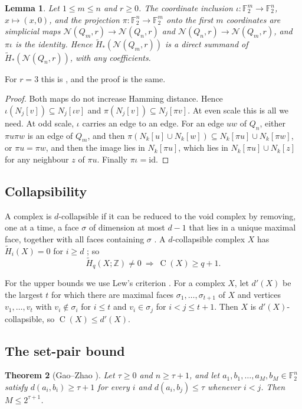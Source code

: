 \documentclass[11pt]{amsart}
\newtheorem{theorem}{Theorem}[section]
\newtheorem{lemma}[theorem]{Lemma}
\theoremstyle{definition}
\theoremstyle{remark}
\newcommand{\N}{\mathcal{N}}
\newcommand{\Q}{Q}
\newcommand{\F}{\mathbb{F}}
\newcommand{\Z}{\mathbb{Z}}
\newcommand{\Hred}{\widetilde{H}}
\newcommand{\cl}[2]{N_{#1}[#2]}
\newcommand{\C}{\operatorname{C}}
\begin{document}
\begin{lemma}\label{lem:retract}
Let $1\le m\le n$ and $r\ge0$. The coordinate inclusion $\iota\colon\F_2^m\to\F_2^n$, $x\mapsto(x,0)$, and the projection
$\pi\colon\F_2^n\to\F_2^m$ onto the first $m$ coordinates are simplicial maps $\N(\Q_m,r)\to\N(\Q_n,r)$ and
$\N(\Q_n,r)\to\N(\Q_m,r)$, and $\pi\iota$ is the identity. Hence $\Hred_*(\N(\Q_m,r))$ is a direct summand of
$\Hred_*(\N(\Q_n,r))$, with any coefficients.
\end{lemma}

For $r=3$ this is \cite[Lemma~5.7]{ASS}, and the proof is the same.

\begin{proof}
Both maps do not increase Hamming distance. Hence $\iota(\cl{j}{v})\subseteq\cl{j}{\iota v}$ and
$\pi(\cl{j}{v})\subseteq\cl{j}{\pi v}$. At even scale this is all we need. At odd scale, $\iota$ carries an edge to an
edge. For an edge $uw$ of $\Q_n$, either $\pi u\pi w$ is an edge of $\Q_m$, and then
$\pi(\cl{k}{u}\cup\cl{k}{w})\subseteq\cl{k}{\pi u}\cup\cl{k}{\pi w}$, or $\pi u=\pi w$, and then the image lies in
$\cl{k}{\pi u}$, which lies in $\cl{k}{\pi u}\cup\cl{k}{z}$ for any neighbour $z$ of $\pi u$. Finally $\pi\iota=\mathrm{id}$.
\end{proof}

\subsection{Collapsibility}
A complex is $d$-collapsible if it can be reduced to the void complex by removing, one at a time, a face $\sigma$ of
dimension at most $d-1$ that lies in a unique maximal face, together with all faces containing $\sigma$ \cite{W}. A
$d$-collapsible complex $X$ has $\Hred_i(X)=0$ for $i\ge d$ \cite{W}; so
\begin{equation}\label{eq:homlower}
\Hred_q(X;\Z)\ne0\ \Longrightarrow\ \C(X)\ge q+1 .
\end{equation}

For the upper bounds we use Lew's criterion \cite[Theorem~4]{Lew}. For a complex $X$, let $d'(X)$ be the largest $t$
for which there are maximal faces $\sigma_1,\dots,\sigma_{t+1}$ of $X$ and vertices $v_1,\dots,v_t$ with
$v_i\notin\sigma_i$ for $i\le t$ and $v_i\in\sigma_j$ for $i<j\le t+1$. Then $X$ is $d'(X)$-collapsible, so
$\C(X)\le d'(X)$.

\subsection{The set-pair bound}
\begin{theorem}[Gao--Zhao {\cite[Theorem~2.2]{GZ}}]\label{thm:GZ}
Let $\tau\ge0$ and $n\ge\tau+1$, and let $a_1,b_1,\dots,a_M,b_M\in\F_2^n$ satisfy $d(a_i,b_i)\ge\tau+1$ for every $i$ and
$d(a_i,b_j)\le\tau$ whenever $i<j$. Then $M\le2^{\tau+1}$.
\end{theorem}
\end{document}
